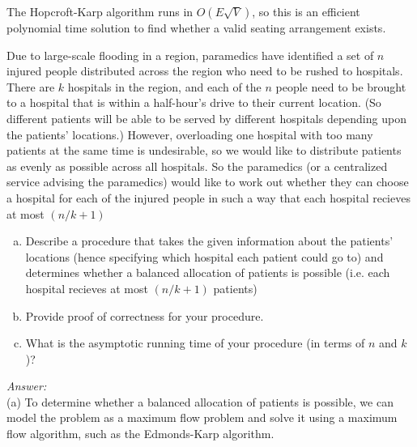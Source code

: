 \documentclass[12pt]{article}
\newenvironment{problem}[2][Problem]{\begin{trivlist}
\item[\hskip \labelsep {\bfseries #1}\hskip \labelsep {\bfseries #2.}]}{\end{trivlist}}
\begin{document}
The Hopcroft-Karp algorithm runs in $O(E \sqrt{V})$, so this is an efficient polynomial time solution to find whether a valid seating arrangement exists.

\begin{problem}{4}
    Due to large-scale flooding in a region, paramedics have identified a set of $n$ injured people distributed across the region who need to be rushed to hospitals. There are $k$ hospitals in the region, and each of the $n$ people need to be brought to a hospital that is within a half-hour's drive to their current location. (So different patients will be able to be served by different hospitals depending upon the patients' locations.) However, overloading one hospital with too many patients at the same time is undesirable, so we would like to distribute patients as evenly as possible across all hospitals. So the paramedics (or a centralized service advising the paramedics) would like to work out whether they can choose a hospital for each of the injured people in such a way that each hospital recieves at most $(n/k+1)$
    \begin{enumerate}[(a)]
        \item Describe a procedure that takes the given information about the patients' locations (hence specifying which hospital each patient could go to) and determines whether a balanced allocation of patients is possible (i.e. each hospital recieves at most $(n/k+1)$ patients)
        \item Provide proof of correctness for your procedure.
        \item What is the asymptotic running time of your procedure (in terms of $n$ and $k$)?
    \end{enumerate}
\end{problem}

\textit{Answer:} 
\\ (a) To determine whether a balanced allocation of patients is possible, we can model the problem as a maximum flow problem and solve it using a maximum flow algorithm, such as the Edmonds-Karp algorithm.
\end{document}
